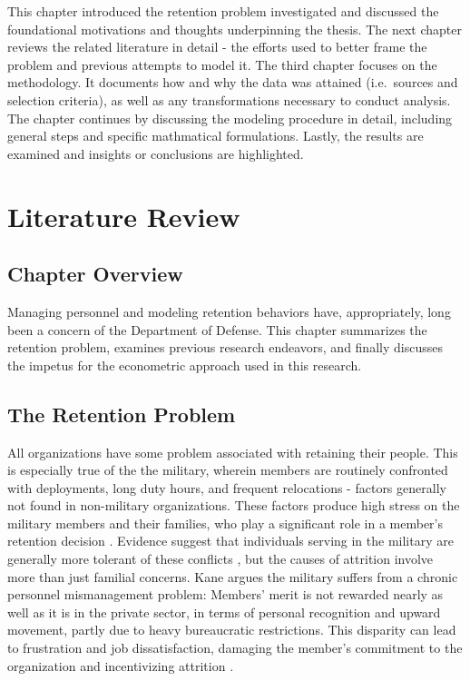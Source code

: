 \documentclass[12pt,letterpaper,toc=flat,oneside]{report}
\theoremstyle{definition}
\theoremstyle{definition}
\theoremstyle{definition}
\theoremstyle{remark}
\begin{document}
This chapter introduced the retention problem investigated and discussed
the foundational motivations and thoughts underpinning the thesis. The
next chapter reviews the related literature in detail - the efforts used
to better frame the problem and previous attempts to model it. The third
chapter focuses on the methodology. It documents how and why the data
was attained (i.e.~sources and selection criteria), as well as any
transformations necessary to conduct analysis. The chapter continues by
discussing the modeling procedure in detail, including general steps and
specific mathmatical formulations. Lastly, the results are examined and
insights or conclusions are highlighted.

\newpage

\hypertarget{literature-review}{%
\chapter{Literature Review}\label{literature-review}}

\hypertarget{chapter-overview}{%
\section{Chapter Overview}\label{chapter-overview}}

Managing personnel and modeling retention behaviors have, appropriately,
long been a concern of the Department of Defense. This chapter
summarizes the retention problem, examines previous research endeavors,
and finally discusses the impetus for the econometric approach used in
this research.

\hypertarget{the-retention-problem}{%
\section{The Retention Problem}\label{the-retention-problem}}

All organizations have some problem associated with retaining their
people. This is especially true of the the military, wherein members are
routinely confronted with deployments, long duty hours, and frequent
relocations - factors generally not found in non-military organizations.
These factors produce high stress on the military members and their
families, who play a significant role in a member's retention decision
\cite{fugita-lakhani-1991}. Evidence suggest that individuals serving in
the military are generally more tolerant of these conflicts
\cite{capon-etal-2007}, but the causes of attrition involve more than
just familial concerns. Kane \cite{kane-2012} argues the military
suffers from a chronic personnel mismanagement problem: Members' merit
is not rewarded nearly as well as it is in the private sector, in terms
of personal recognition and upward movement, partly due to heavy
bureaucratic restrictions. This disparity can lead to frustration and
job dissatisfaction, damaging the member's commitment to the
organization and incentivizing attrition \cite{capon-etal-2007}.
\end{document}
